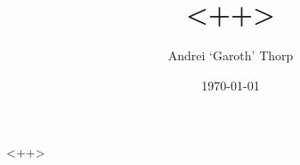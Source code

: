 \documentclass[a4paper,12pt]{article}
\begin{document}
\title{ <++>}
\author{Andrei `Garoth' Thorp}
\date{\today}
\maketitle

<++>
\end{document}

